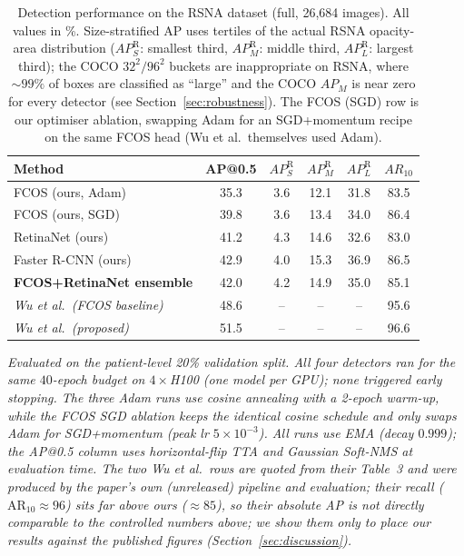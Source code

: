\documentclass[11pt,a4paper]{article}
\begin{document}
\begin{table}[H]
\centering
\caption{Detection performance on the RSNA dataset (full, 26{,}684 images). All values in \%. Size-stratified AP uses tertiles of the actual RSNA opacity-area distribution ($AP_S^{\mathrm{R}}$: smallest third, $AP_M^{\mathrm{R}}$: middle third, $AP_L^{\mathrm{R}}$: largest third); the COCO $32^2 / 96^2$ buckets are inappropriate on RSNA, where $\sim 99\%$ of boxes are classified as ``large'' and the COCO $AP_M$ is near zero for every detector (see Section~\ref{sec:robustness}). The FCOS (SGD) row is our optimiser ablation, swapping Adam for an SGD+momentum recipe on the same FCOS head (Wu et al.\ themselves used Adam).}
\label{tab:comparison}
\begin{tabular}{lccccc}
\toprule
Method & AP@0.5 & $AP_S^{\mathrm{R}}$ & $AP_M^{\mathrm{R}}$ & $AP_L^{\mathrm{R}}$ & $AR_{10}$ \\
\midrule
FCOS (ours, Adam) & 35.3 & 3.6 & 12.1 & 31.8 & 83.5 \\
FCOS (ours, SGD) & 39.8 & 3.6 & 13.4 & 34.0 & 86.4 \\
RetinaNet (ours) & 41.2 & 4.3 & 14.6 & 32.6 & 83.0 \\
Faster R-CNN (ours) & 42.9 & 4.0 & 15.3 & 36.9 & 86.5 \\
\textbf{FCOS+RetinaNet ensemble} & 42.0 & 4.2 & 14.9 & 35.0 & 85.1 \\
\midrule
\textit{Wu et al.\ (FCOS baseline)} & 48.6 & -- & -- & -- & 95.6 \\
\textit{Wu et al.\ (proposed)} & 51.5 & -- & -- & -- & 96.6 \\
\bottomrule
\end{tabular}
\vspace{0.3em}

\footnotesize\textit{Evaluated on the patient-level 20\% validation split. All four detectors ran for the same $40$-epoch budget on $4\!\times\!$H100 (one model per GPU); none triggered early stopping. The three Adam runs use cosine annealing with a 2-epoch warm-up, while the FCOS SGD ablation keeps the identical cosine schedule and only swaps Adam for SGD+momentum (peak lr $5\times10^{-3}$). All runs use EMA (decay $0.999$); the AP@0.5 column uses horizontal-flip TTA and Gaussian Soft-NMS at evaluation time. The two \emph{Wu et al.}\ rows are quoted from their Table~3 and were produced by the paper's own (unreleased) pipeline and evaluation; their recall ($\mathrm{AR}_{10}\approx 96$) sits far above ours ($\approx 85$), so their absolute AP is \emph{not} directly comparable to the controlled numbers above; we show them only to place our results against the published figures (Section~\ref{sec:discussion}).}
\end{table}
\end{document}
